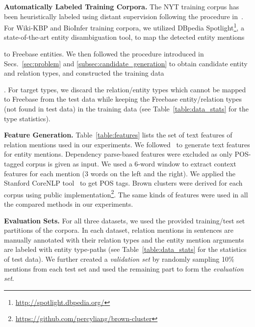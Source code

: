 \documentclass[letterpaper]{sig-alternate-2013}
\begin{document}
\smallskip
\noindent
\textsf{\small\textbf{Automatically Labeled Training Corpora.}}
The NYT training corpus has been heuristically labeled using distant supervision following the procedure in~\cite{riedel2010modeling}.
For Wiki-KBP and BioInfer training corpora, we utilized DBpedia Spotlight\footnote{\scriptsize \url{http://spotlight.dbpedia.org/}}, a state-of-the-art entity disambiguation tool, to map the detected entity mentions \begin{small}\end{small} to Freebase entities.
We then followed the procedure introduced in Secs.~\ref{sec:problem} and \ref{subsec:candidate_generation} to obtain candidate entity and relation types, and constructed the training data \begin{small}\end{small}.
For target types, we discard the relation/entity types which cannot be mapped to Freebase from the test data while keeping the Freebase entity/relation types (not found in test data) in the training data (see Table~\ref{table:data_stats} for the type statistics).




\smallskip
\noindent
\textsf{\small\textbf{Feature Generation.}}
Table~\ref{table:features} lists the set of text features of relation mentions used in our experiments. We followed~\cite{ling2012fine} to generate text features for entity mentions. Dependency parse-based features were excluded as only POS-tagged corpus is given as input. 
We used a 6-word window to extract context features for each mention (3 words on the left and the right).
We applied the Stanford CoreNLP tool~\cite{manning2014stanford} to get POS tags.
Brown clusters were derived for each corpus using public implementation\footnote{\scriptsize \url{https://github.com/percyliang/brown-cluster}}.
The same kinds of features were used in all the compared methods in our experiments.


\smallskip
\noindent
\textsf{\small\textbf{Evaluation Sets.}}
For all three datasets, we used the provided training/test set partitions of the corpora. In each dataset, relation mentions in sentences are manually annotated with their relation types and the entity mention arguments are labeled with entity type-paths (see Table~\ref{table:data_stats} for the statistics of test data). 
We further created a \textit{validation set} by randomly sampling 10\% mentions from each test set and used the remaining part to form the \textit{evaluation set}.
\end{document}
